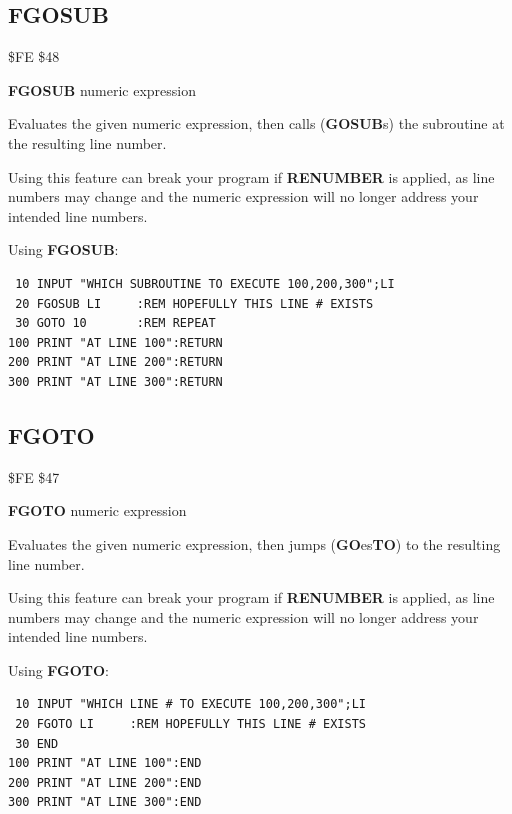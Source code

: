 \subsection{FGOSUB}
\begin{description}[leftmargin=2cm,style=nextline]
\item [Token:] \$FE \$48
\item [Format:] {\bf FGOSUB} numeric expression
\item [Usage:] Evaluates the given numeric expression, then calls ({\bf GOSUB}s) the subroutine at the resulting line number.

\item [Warning:] Using this feature can break your program if {\bf RENUMBER}
is applied, as line numbers may change and the
numeric expression will no longer address your intended line numbers.

\item [Example:] Using {\bf FGOSUB}:
\begin{tcolorbox}[colback=black,coltext=white]
\verbatimfont{\codefont}
\begin{verbatim}
 10 INPUT "WHICH SUBROUTINE TO EXECUTE 100,200,300";LI
 20 FGOSUB LI     :REM HOPEFULLY THIS LINE # EXISTS
 30 GOTO 10       :REM REPEAT
100 PRINT "AT LINE 100":RETURN
200 PRINT "AT LINE 200":RETURN
300 PRINT "AT LINE 300":RETURN
\end{verbatim}
\end{tcolorbox}
\end{description}


\newpage
\subsection{FGOTO}
\begin{description}[leftmargin=2cm,style=nextline]
\item [Token:] \$FE \$47
\item [Format:] {\bf FGOTO} numeric expression
\item [Usage:] Evaluates the given numeric expression, then jumps ({\bf GO}es{\bf TO}) to the resulting line number.

\item [Warning:] Using this feature can break your program if {\bf RENUMBER}
                 is applied, as line numbers may change and the
                 numeric expression will no longer address your intended line numbers.

\item [Example:] Using {\bf FGOTO}:
\begin{tcolorbox}[colback=black,coltext=white]
\verbatimfont{\codefont}
\begin{verbatim}
 10 INPUT "WHICH LINE # TO EXECUTE 100,200,300";LI
 20 FGOTO LI     :REM HOPEFULLY THIS LINE # EXISTS
 30 END
100 PRINT "AT LINE 100":END
200 PRINT "AT LINE 200":END
300 PRINT "AT LINE 300":END
\end{verbatim}
\end{tcolorbox}
\end{description}



